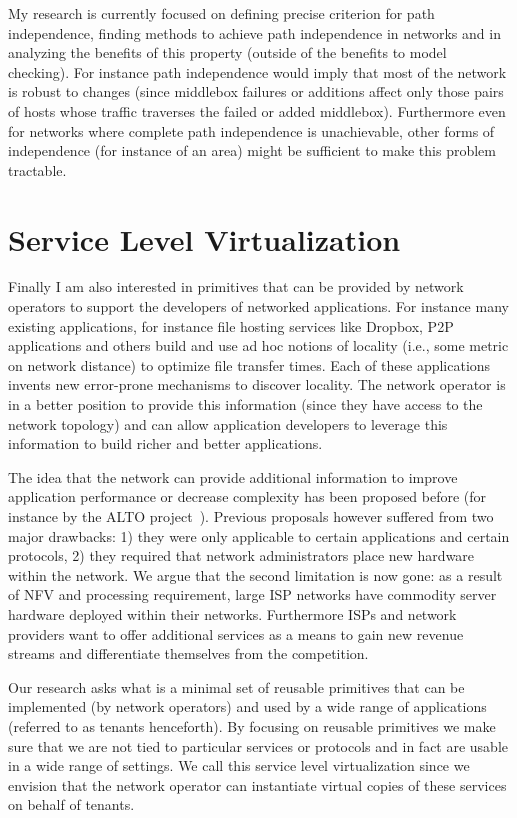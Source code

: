 \documentclass[letterpaper]{article}
\begin{document}
My research is currently focused on defining precise criterion for path independence, finding  methods to achieve path
independence in networks and in analyzing the benefits of this property (outside of the benefits to model checking). For
instance path independence would imply that most of the network is robust to changes (since middlebox failures or
additions affect only those pairs of hosts whose traffic traverses the failed or added middlebox). 
Furthermore even for networks where complete path independence is unachievable, other forms of independence (for
instance of an area) might be sufficient to make this problem tractable.

\section*{Service Level Virtualization}
Finally I am also interested in primitives that can be provided by network operators to support the developers of
networked applications. For instance many existing applications, for instance file hosting services like Dropbox, P2P
applications and others build and use ad hoc notions of locality (i.e., some metric on network distance) to optimize
file transfer times. Each of these applications invents new error-prone mechanisms to discover locality. The network
operator is in a better position to provide this information (since they have access to the network topology) and can
allow application developers to leverage this information to build richer and better applications.

The idea that the network can provide additional information to improve application performance or decrease complexity
has been proposed before (for instance by the ALTO project~\cite{seedorf2009traffic}). Previous proposals however
suffered from two major drawbacks: 1) they were only applicable to certain applications and certain protocols, 2) they
required that network administrators place new hardware within the network. We argue that the second limitation is now
gone: as a result of NFV and processing requirement, large ISP networks have commodity server hardware deployed within
their networks. Furthermore ISPs and network providers want to offer additional services as a means to gain new revenue
streams and differentiate themselves from the competition.

Our research asks what is a minimal set of reusable primitives that can be implemented (by network operators) and used
by a wide range of applications (referred to as tenants henceforth). By focusing on reusable primitives we make sure
that we are not tied to particular services or protocols and in fact are usable in a wide range of settings. We call
this service level virtualization since we envision that the network operator can instantiate virtual copies of these
services on behalf of tenants.
\end{document}
